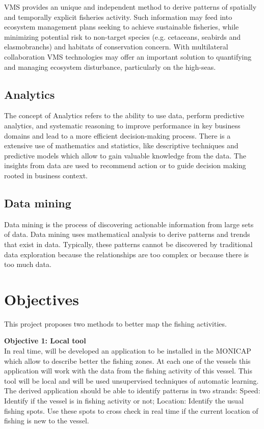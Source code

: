 VMS provides an unique and independent method to derive patterns of spatially and temporally explicit fisheries activity. Such information may feed into ecosystem management plans seeking to achieve sustainable fisheries, while minimizing potential risk to non-target species (e.g. cetaceans, seabirds and elasmobranchs) and habitats of conservation concern. With multilateral collaboration VMS technologies may offer an important solution to quantifying and managing ecosystem disturbance, particularly on the high-seas.




\subsection{Analytics} %
\label{sub:analytucs}
The concept of Analytics refers to the ability to use data, perform predictive analytics, and systematic reasoning to improve performance in key business domains and lead to a more efficient decision-making process.
There is a extensive use of mathematics and statistics, like descriptive techniques and predictive models which allow to gain valuable knowledge from the data.
The insights from data are used to recommend action or to guide decision making rooted in business context.



\subsection{Data mining} %
\label{sub:data_mining}
Data mining is the process of discovering actionable information from large sets of data. Data mining uses mathematical analysis to derive patterns and trends that exist in data. Typically, these patterns cannot be discovered by traditional data exploration because the relationships are too complex or because there is too much data.





\section{Objectives} %
\label{sec:objectives}
This project proposes two methods to better map the fishing activities. 

 \textbf{Objective 1: Local tool} \\
In real time, will be developed an application to be installed in the MONICAP which allow to describe better the fishing zones. At each one of the vessels this application will work with the data from the fishing activity of this vessel. This tool will be local and will be used unsupervised techniques of automatic learning.
The derived application should be able to identify patterns in two strands:
Speed: Identify if the vessel is in fishing activity or not;
Location: Identify the usual fishing spots. Use these spots to cross check in real time if the current location of fishing is new to the vessel.

